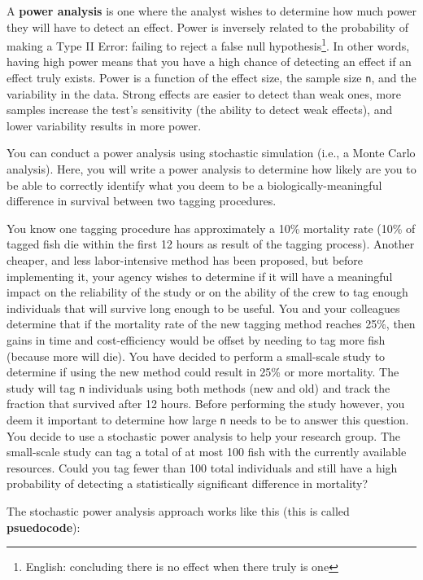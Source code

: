 \documentclass[]{book}
\let\rmarkdownfootnote\footnote%
\def\footnote{\protect\rmarkdownfootnote}
\begin{document}
A \textbf{power analysis} is one where the analyst wishes to determine how much power they will have to detect an effect. Power is inversely related to the probability of making a Type II Error: failing to reject a false null hypothesis\footnote{English: concluding there is no effect when there truly is one}. In other words, having high power means that you have a high chance of detecting an effect if an effect truly exists. Power is a function of the effect size, the sample size \texttt{n}, and the variability in the data. Strong effects are easier to detect than weak ones, more samples increase the test's sensitivity (the ability to detect weak effects), and lower variability results in more power.

You can conduct a power analysis using stochastic simulation (i.e., a Monte Carlo analysis). Here, you will write a power analysis to determine how likely are you to be able to correctly identify what you deem to be a biologically-meaningful difference in survival between two tagging procedures.

You know one tagging procedure has approximately a 10\% mortality rate (10\% of tagged fish die within the first 12 hours as result of the tagging process). Another cheaper, and less labor-intensive method has been proposed, but before implementing it, your agency wishes to determine if it will have a meaningful impact on the reliability of the study or on the ability of the crew to tag enough individuals that will survive long enough to be useful. You and your colleagues determine that if the mortality rate of the new tagging method reaches 25\%, then gains in time and cost-efficiency would be offset by needing to tag more fish (because more will die). You have decided to perform a small-scale study to determine if using the new method could result in 25\% or more mortality. The study will tag \texttt{n} individuals using both methods (new and old) and track the fraction that survived after 12 hours. Before performing the study however, you deem it important to determine how large \texttt{n} needs to be to answer this question. You decide to use a stochastic power analysis to help your research group. The small-scale study can tag a total of at most 100 fish with the currently available resources. Could you tag fewer than 100 total individuals and still have a high probability of detecting a statistically significant difference in mortality?

The stochastic power analysis approach works like this (this is called \textbf{psuedocode}):
\end{document}
